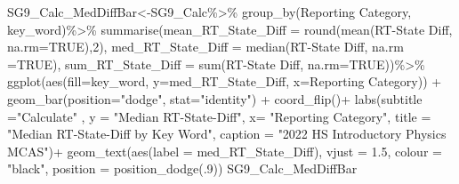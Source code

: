 \documentclass[
  letterpaper,
  DIV=11,
  numbers=noendperiod]{scrartcl}
\newenvironment{Shaded}{\begin{snugshade}}{\end{snugshade}}
\newcommand{\AttributeTok}[1]{\textcolor[rgb]{0.40,0.45,0.13}{#1}}
\newcommand{\ConstantTok}[1]{\textcolor[rgb]{0.56,0.35,0.01}{#1}}
\newcommand{\DecValTok}[1]{\textcolor[rgb]{0.68,0.00,0.00}{#1}}
\newcommand{\FloatTok}[1]{\textcolor[rgb]{0.68,0.00,0.00}{#1}}
\newcommand{\FunctionTok}[1]{\textcolor[rgb]{0.28,0.35,0.67}{#1}}
\newcommand{\NormalTok}[1]{\textcolor[rgb]{0.00,0.23,0.31}{#1}}
\newcommand{\OtherTok}[1]{\textcolor[rgb]{0.00,0.23,0.31}{#1}}
\newcommand{\SpecialCharTok}[1]{\textcolor[rgb]{0.37,0.37,0.37}{#1}}
\newcommand{\StringTok}[1]{\textcolor[rgb]{0.13,0.47,0.30}{#1}}
\begin{document}
\begin{Shaded}
\begin{Highlighting}[]
\NormalTok{SG9\_Calc\_MedDiffBar}\OtherTok{\textless{}{-}}\NormalTok{SG9\_Calc}\SpecialCharTok{\%\textgreater{}\%}
  \FunctionTok{group\_by}\NormalTok{(}\StringTok{\textasciigrave{}}\AttributeTok{Reporting Category}\StringTok{\textasciigrave{}}\NormalTok{, }\StringTok{\textasciigrave{}}\AttributeTok{key\_word}\StringTok{\textasciigrave{}}\NormalTok{)}\SpecialCharTok{\%\textgreater{}\%}
  \FunctionTok{summarise}\NormalTok{(}\AttributeTok{mean\_RT\_State\_Diff =} \FunctionTok{round}\NormalTok{(}\FunctionTok{mean}\NormalTok{(}\StringTok{\textasciigrave{}}\AttributeTok{RT{-}State Diff}\StringTok{\textasciigrave{}}\NormalTok{, }\AttributeTok{na.rm=}\ConstantTok{TRUE}\NormalTok{),}\DecValTok{2}\NormalTok{),}
            \AttributeTok{med\_RT\_State\_Diff =} \FunctionTok{median}\NormalTok{(}\StringTok{\textasciigrave{}}\AttributeTok{RT{-}State Diff}\StringTok{\textasciigrave{}}\NormalTok{, }\AttributeTok{na.rm =}\ConstantTok{TRUE}\NormalTok{),}
            \AttributeTok{sum\_RT\_State\_Diff =} \FunctionTok{sum}\NormalTok{(}\StringTok{\textasciigrave{}}\AttributeTok{RT{-}State Diff}\StringTok{\textasciigrave{}}\NormalTok{, }\AttributeTok{na.rm=}\ConstantTok{TRUE}\NormalTok{))}\SpecialCharTok{\%\textgreater{}\%}
   \FunctionTok{ggplot}\NormalTok{(}\FunctionTok{aes}\NormalTok{(}\AttributeTok{fill=}\StringTok{\textasciigrave{}}\AttributeTok{key\_word}\StringTok{\textasciigrave{}}\NormalTok{, }\AttributeTok{y=}\NormalTok{med\_RT\_State\_Diff, }\AttributeTok{x=}\StringTok{\textasciigrave{}}\AttributeTok{Reporting Category}\StringTok{\textasciigrave{}}\NormalTok{)) }\SpecialCharTok{+} \FunctionTok{geom\_bar}\NormalTok{(}\AttributeTok{position=}\StringTok{"dodge"}\NormalTok{, }\AttributeTok{stat=}\StringTok{"identity"}\NormalTok{) }\SpecialCharTok{+} \FunctionTok{coord\_flip}\NormalTok{()}\SpecialCharTok{+}
   \FunctionTok{labs}\NormalTok{(}\AttributeTok{subtitle =}\StringTok{"Calculate"}\NormalTok{ ,}
       \AttributeTok{y =} \StringTok{"Median RT{-}State{-}Diff"}\NormalTok{,}
       \AttributeTok{x=} \StringTok{"Reporting Category"}\NormalTok{,}
       \AttributeTok{title =} \StringTok{"Median RT{-}State{-}Diff by Key Word"}\NormalTok{,}
      \AttributeTok{caption =} \StringTok{"2022 HS Introductory Physics MCAS"}\NormalTok{)}\SpecialCharTok{+}
   \FunctionTok{geom\_text}\NormalTok{(}\FunctionTok{aes}\NormalTok{(}\AttributeTok{label =} \StringTok{\textasciigrave{}}\AttributeTok{med\_RT\_State\_Diff}\StringTok{\textasciigrave{}}\NormalTok{), }\AttributeTok{vjust =} \FloatTok{1.5}\NormalTok{, }\AttributeTok{colour =} \StringTok{"black"}\NormalTok{, }\AttributeTok{position =} \FunctionTok{position\_dodge}\NormalTok{(.}\DecValTok{9}\NormalTok{))}
\NormalTok{SG9\_Calc\_MedDiffBar}
\end{Highlighting}
\end{Shaded}
\end{document}
